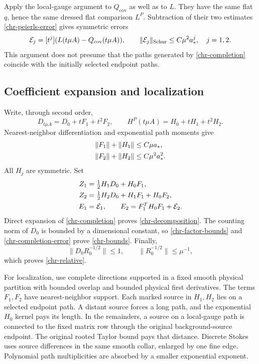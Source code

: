 \documentclass[11pt]{article}
\theoremstyle{remark}
\begin{document}
Apply the local-gauge argument to \(Q_{\mathrm{cov}}\) as well
as to \(L\).  They have the same flat \(q\), hence the same dressed
flat comparison \(L^P\).  Subtraction of their two estimates
\eqref{chr-peierls-error} gives symmetric errors
\begin{equation}
 {\cal E}_j=[t^j](L(t\mu A)-Q_{\mathrm{cov}}(t\mu A)),
 \qquad
 \|{\cal E}_j\|_{\mathrm{Schur}}
           \leq C\mu^2a_*^j,\quad j=1,2.
 \label{chr-completion-error}
\end{equation}
This argument does not presume that the paths generated by
\eqref{chr-completion} coincide with the initially selected
endpoint paths.

\subsection{Coefficient expansion and localization}
\label{chr-expansion}

Write, through second order,
\[
 D_{t\mu A}=D_0+tF_1+t^2F_2,\qquad
 H^P(t\mu A)=H_0+tH_1+t^2H_2.
\]
Nearest-neighbor differentiation and exponential path moments give
\begin{align}
 \|F_1\|+\|H_1\|&\leq C\mu a_*,
 \notag\\
 \|F_2\|+\|H_2\|&\leq C\mu^2a_*^2 .
 \label{chr-factor-bounds}
\end{align}
All \(H_j\) are symmetric.  Set
\begin{align}
 Z_1&=\tfrac12H_1D_0+H_0F_1,
 \notag\\
 Z_2&=\tfrac12H_2D_0+H_1F_1+H_0F_2,
 \notag\\
 E_1&={\cal E}_1,\qquad
 E_2=F_1^TH_0F_1+{\cal E}_2 .
 \label{chr-exact-z}
\end{align}
Direct expansion of \eqref{chr-completion} proves
\eqref{chr-decomposition}.  The counting norm of \(D_0\) is bounded
by a dimensional constant, so \eqref{chr-factor-bounds} and
\eqref{chr-completion-error} prove \eqref{chr-bounds}.
Finally,
\[
 \|D_0R_0^{-1/2}\|\leq1,\qquad
 \|R_0^{-1/2}\|\leq\mu^{-1},
\]
which proves \eqref{chr-relative}.

For localization, use complete directions supported in a fixed
smooth physical partition with bounded overlap and bounded physical
first derivatives.  The terms \(F_1,F_2\) have nearest-neighbor
support.  Each marked source in \(H_1,H_2\) lies on a selected
endpoint path.  A distant source forces a long path, and the
exponential \(H_0\) kernel pays its length.  In the remainders,
a source on a local-gauge path is connected to the fixed matrix
row through the original background-source endpoint.  The
original rooted Taylor bound pays that distance.  Discrete
Stokes uses source differences in the same smooth collar,
enlarged by one fine edge.  Polynomial path multiplicities are
absorbed by a smaller exponential exponent.
\end{document}
